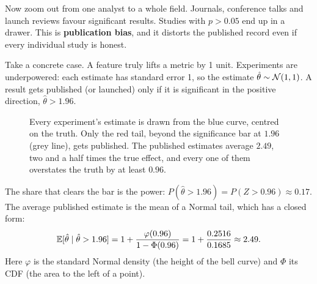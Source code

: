 Now zoom out from one analyst to a whole field. Journals, conference talks and
launch reviews favour significant results. Studies with $p>0.05$ end up in a
drawer. This is \textbf{publication bias}, and it distorts the published record
even if every individual study is honest.

Take a concrete case. A feature truly lifts a metric by 1 unit. Experiments are
underpowered: each estimate has standard error 1, so the estimate
$\hat\theta\sim\mathcal{N}(1,1)$. A result gets published (or launched) only if it is
significant in the positive direction, $\hat\theta>1.96$.

\begin{figure}[H]
\centering
{}
\caption{Every experiment's estimate is drawn from the blue curve, centred on the
truth. Only the red tail, beyond the significance bar at $1.96$ (grey line), gets
published. The published estimates
average $2.49$, two and a half times the true effect, and every one of them
overstates the truth by at least $0.96$.}
\label{fig:pitfalls-winner}
\end{figure}

The share that clears the bar is the power: $P(\hat\theta>1.96)=P(Z>0.96)\approx
0.17$. The average published estimate is the mean of a Normal tail, which has a
closed form:
\[
  \operatorname{\mathbb{E}}[\hat\theta \mid \hat\theta>1.96] = 1+\frac{\varphi(0.96)}{1-\Phi(0.96)}
  = 1+\frac{0.2516}{0.1685}\approx 2.49.
\]
Here $\varphi$ is the standard Normal density (the height of the bell curve) and
$\Phi$ its CDF (the area to the left of a point).

